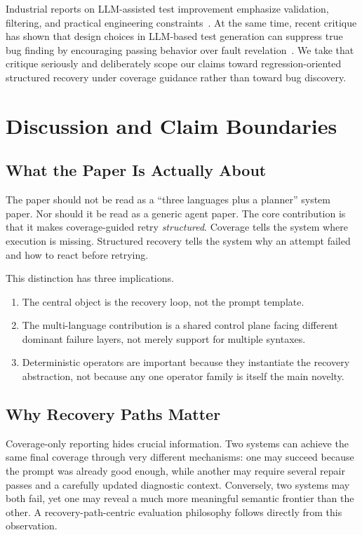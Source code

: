 \documentclass[10pt]{article}
\begin{document}
Industrial reports on LLM-assisted test improvement emphasize validation, filtering, and practical engineering constraints~\cite{alshahwan2024testgenllm}. At the same time, recent critique has shown that design choices in LLM-based test generation can suppress true bug finding by encouraging passing behavior over fault revelation~\cite{mathews2024designchoices}. We take that critique seriously and deliberately scope our claims toward regression-oriented structured recovery under coverage guidance rather than toward bug discovery.

\section{Discussion and Claim Boundaries}
\label{sec:discussion}

\subsection{What the Paper Is Actually About}

The paper should not be read as a ``three languages plus a planner'' system paper. Nor should it be read as a generic agent paper. The core contribution is that it makes coverage-guided retry \emph{structured}. Coverage tells the system where execution is missing. Structured recovery tells the system why an attempt failed and how to react before retrying.

This distinction has three implications.

\begin{enumerate}[leftmargin=1.4em]
    \item The central object is the recovery loop, not the prompt template.
    \item The multi-language contribution is a shared control plane facing different dominant failure layers, not merely support for multiple syntaxes.
    \item Deterministic operators are important because they instantiate the recovery abstraction, not because any one operator family is itself the main novelty.
\end{enumerate}

\subsection{Why Recovery Paths Matter}

Coverage-only reporting hides crucial information. Two systems can achieve the same final coverage through very different mechanisms: one may succeed because the prompt was already good enough, while another may require several repair passes and a carefully updated diagnostic context. Conversely, two systems may both fail, yet one may reveal a much more meaningful semantic frontier than the other. A recovery-path-centric evaluation philosophy follows directly from this observation.
\end{document}
